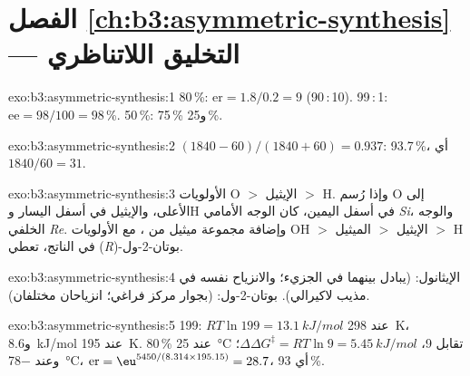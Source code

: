 \section*{الفصل \ref{ch:b3:asymmetric-synthesis} --- التخليق اللاتناظري}

\begin{solution}{exo:b3:asymmetric-synthesis:1}
 80\,\%: $\mathrm{er} = 1.8/0.2 = 9$ (90\,:\,10).  99\,:\,1: $\mathrm{ee} = 98/100 = 98$\,\%.  50\,\%: 75\,\% و25\,\%.
\end{solution}

\begin{solution}{exo:b3:asymmetric-synthesis:2}
$(1840 - 60)/(1840 + 60) = 0.937$:  93.7\,\%، أي  $1840/60 = 31$.
\end{solution}

\begin{solution}{exo:b3:asymmetric-synthesis:3}
الأولويات O $>$ الإيثيل $>$ H. وإذا رُسم O إلى الأعلى، والإيثيل في أسفل اليسار وH في أسفل اليمين، كان
الوجه الأمامي \textit{Si}، والوجه الخلفي \textit{Re}. وإضافة مجموعة ميثيل من ، مع
الأولويات OH $>$ الإيثيل $>$ الميثيل $>$ H في الناتج، تعطي (\textit{R})-بوتان-2-ول.
\end{solution}

\begin{solution}{exo:b3:asymmetric-synthesis:4}
الإيثانول:  (يبادل بينهما  في الجزيء؛ والانزياح
نفسه في مذيب لاكيرالي). بوتان-2-ول:  (بجوار مركز فراغي؛
انزياحان مختلفان).
\end{solution}

\begin{solution}{exo:b3:asymmetric-synthesis:5}
 199: $RT\ln 199 = \qty{13.1}{kJ/mol}$ عند \qty{298}{K}، و\qty{8.6}{kJ/mol} عند \qty{195}{K}.  80\,\% عند \qty{25}{\celsius} تقابل  9،
$\Delta\Delta G^\ddagger = RT\ln 9 = \qty{5.45}{kJ/mol}$؛ وعند \qty{-78}{\celsius}، $\mathrm{er} = \eu^{5450/(8.314 \times 195.15)} = 28.7$، أي  93\,\%.
\end{solution}

